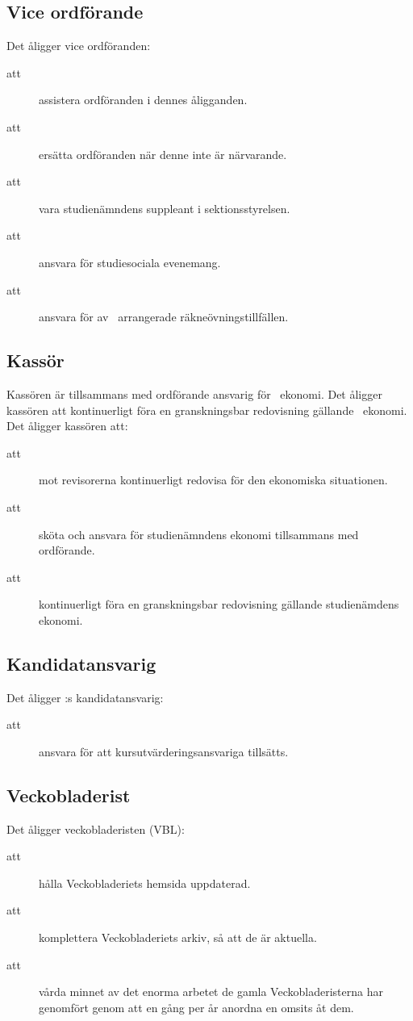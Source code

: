     
\subsection{Vice ordförande}
Det åligger vice ordföranden:

\begin{description}
      \item[att] assistera ordföranden i dennes åligganden.
      \item[att] ersätta ordföranden när denne inte är närvarande. 
      \item[att] vara studienämndens suppleant i sektionsstyrelsen.
      \item[att] ansvara för studiesociala evenemang.
      \item[att] ansvara för av \forening\  arrangerade räkneövningstillfällen.
\end{description}


\subsection{Kassör}
Kassören är tillsammans med ordförande ansvarig för \forening \ ekonomi. Det åligger kassören att kontinuerligt föra en granskningsbar redovisning gällande \forening \ ekonomi.\\

Det åligger kassören att:
\begin{description}
    \item[att] mot revisorerna kontinuerligt redovisa för den ekonomiska situationen.
    \item[att] sköta och ansvara för studienämndens ekonomi tillsammans med ordförande.
    \item[att] kontinuerligt föra en granskningsbar redovisning gällande studienämdens ekonomi.
\end{description}

\subsection{Kandidatansvarig}
Det åligger \forening:s kandidatansvarig:
\begin{description}
      \item[att] ansvara för att kursutvärderingsansvariga tillsätts.
\end{description}

\subsection{Veckobladerist}
  Det åligger veckobladeristen (VBL):
\begin{description}
      \item[att] hålla Veckobladeriets hemsida uppdaterad.
      \item[att] komplettera Veckobladeriets arkiv, så att de är aktuella.
      \item[att] vårda minnet av det enorma arbetet de gamla Veckobladeristerna har genomfört genom att en gång per år anordna en omsits åt dem. 
\end{description}


